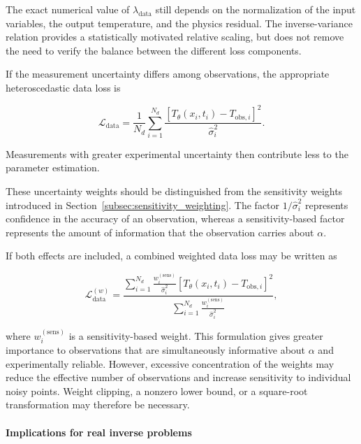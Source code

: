 The exact numerical value of $\lambda_{\mathrm{data}}$ still depends on the
normalization of the input variables, the output temperature, and the physics
residual. The inverse-variance relation provides a statistically motivated
relative scaling, but does not remove the need to verify the balance between
the different loss components.

If the measurement uncertainty differs among observations, the appropriate
heteroscedastic data loss is

\begin{equation}
\mathcal{L}_{\mathrm{data}}
=
\frac{1}{N_d}
\sum_{i=1}^{N_d}
\frac{
\left[
T_{\theta}(x_i,t_i)
-
T_{\mathrm{obs},i}
\right]^2
}{
\widehat{\sigma}_i^2
}.
\end{equation}

Measurements with greater experimental uncertainty then contribute less to the
parameter estimation.

These uncertainty weights should be distinguished from the sensitivity weights
introduced in Section~\ref{subsec:sensitivity_weighting}. The factor
$1/\widehat{\sigma}_i^2$ represents confidence in the accuracy of an
observation, whereas a sensitivity-based factor represents the amount of
information that the observation carries about $\alpha$.

If both effects are included, a combined weighted data loss may be written as

\begin{equation}
\mathcal{L}_{\mathrm{data}}^{(w)}
=
\frac{
\displaystyle
\sum_{i=1}^{N_d}
\frac{w_i^{(\mathrm{sens})}}{\widehat{\sigma}_i^2}
\left[
T_{\theta}(x_i,t_i)-T_{\mathrm{obs},i}
\right]^2
}{
\displaystyle
\sum_{i=1}^{N_d}
\frac{w_i^{(\mathrm{sens})}}{\widehat{\sigma}_i^2}
},
\end{equation}

where $w_i^{(\mathrm{sens})}$ is a sensitivity-based weight. This formulation
gives greater importance to observations that are simultaneously informative
about $\alpha$ and experimentally reliable. However, excessive concentration
of the weights may reduce the effective number of observations and increase
sensitivity to individual noisy points. Weight clipping, a nonzero lower bound,
or a square-root transformation may therefore be necessary.

\paragraph{Implications for real inverse problems}

